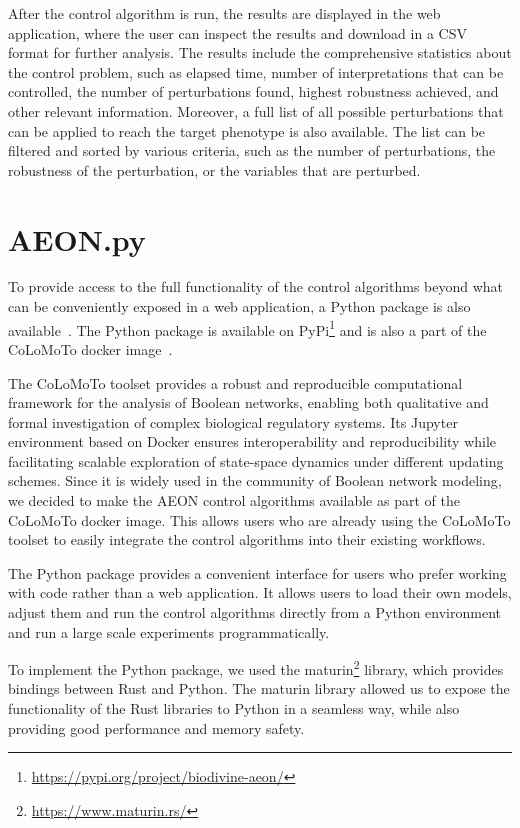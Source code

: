 After the control algorithm is run, the results are displayed in the web application, where the user can inspect the results and download in a CSV format for further analysis. The results include the comprehensive statistics about the control problem, such as elapsed time, number of interpretations that can be controlled, the number of perturbations found, highest robustness achieved, and other relevant information. Moreover, a full list of all possible perturbations that can be applied to reach the target phenotype is also available. The list can be filtered and sorted by various criteria, such as the number of perturbations, the robustness of the perturbation, or the variables that are perturbed. 

\section{AEON.py}
\label{sec:python_package}

To provide access to the full functionality of the control algorithms beyond what can be conveniently exposed in a web application, a Python package is also available~\cite{aeonpy}. The Python package is available on PyPi\footnote{\url{https://pypi.org/project/biodivine-aeon/}} and is also a part of the CoLoMoTo docker image~\cite{Naldi2015}.

The CoLoMoTo toolset provides a robust and reproducible computational framework for the analysis of Boolean networks, enabling both qualitative and formal investigation of complex biological regulatory systems. Its Jupyter environment based on Docker ensures interoperability and reproducibility while facilitating scalable exploration of state-space dynamics under different updating schemes. Since it is widely used in the community of Boolean network modeling, we decided to make the AEON control algorithms available as part of the CoLoMoTo docker image. This allows users who are already using the CoLoMoTo toolset to easily integrate the control algorithms into their existing workflows.

The Python package provides a convenient interface for users who prefer working with code rather than a web application. It allows users to load their own \PBN{} models, adjust them and run the control algorithms directly from a Python environment and run a large scale experiments programmatically. 

To implement the Python package, we used the maturin\footnote{\url{https://www.maturin.rs/}} library, which provides bindings between Rust and Python. The maturin library allowed us to expose the functionality of the Rust libraries to Python in a seamless way, while also providing good performance and memory safety. 

